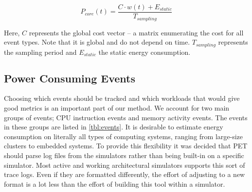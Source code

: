\begin{equation}
    P_{core}(t) = \frac{C \cdot w(t) + E_{static}}{T_{sampling}}
\end{equation}

Here, $C$ represents the global cost vector -- a matrix enumerating the cost
for all event types. Note that it is global and do not depend on time.
$T_{sampling}$ represents the sampling period and $E_{static}$ the static energy
consumption.

\subsection{Power Consuming Events}
\label{subsec:powerevents}

Choosing which events should be tracked and which workloads that would give good
metrics is an important part of our method. We account for two main groups of
events; CPU instruction events and memory activity events. The events in these
groups are listed in \autoref{tbl:events}. It is desirable to estimate energy
consumption on literally all types of computing systems, ranging from large-size
clusters to embedded systems. To provide this flexibility it was decided that
PET should parse log files from the simulators rather than being built-in on a
specific simulator. Most active and working architectural simulators supports this
sort of trace logs. Even if they are formatted differently, the effort of
adjusting to a new format is a lot less than the effort of building this tool
within a simulator.

